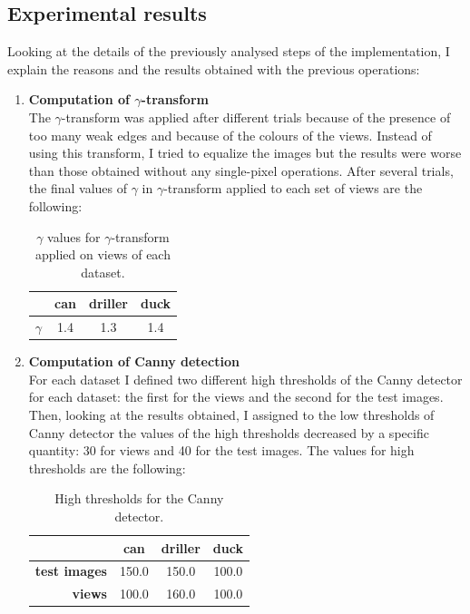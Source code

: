 \documentclass{article}
\begin{document}
\subsection{Experimental results}\label{exp}
Looking at the details of the previously analysed steps of the implementation, I explain the reasons and the results obtained with the previous operations:
\begin{enumerate}
\item{\textbf{Computation of $\gamma$-transform}\\
The $\gamma$-transform was applied after different trials because of the presence of too many weak edges and because of the colours of the views. Instead of using this transform, I tried to equalize the images but the results were worse than those obtained without any single-pixel operations. After several trials, the final values of $\gamma$ in $\gamma$-transform applied to each set of views are the following:
\begin{table}[H]
\footnotesize\centering
\begin{tabular}{rccc}
\cline{2-4}
& \textbf{can} & \textbf{driller} & \textbf{duck}\\
\hline
{$\mathtt{\gamma}$} & {1.4} & {1.3} & {1.4}\\
\hline
\end{tabular}
\caption{$\gamma$ values for $\gamma$-transform applied on views of each dataset.}
\end{table}
}
\item{\textbf{Computation of Canny detection}\\
For each dataset I defined two different high thresholds of the Canny detector for each dataset: the first for the views and the second for the test images. Then, looking at the results obtained, I assigned to the low thresholds of Canny detector the values of the high thresholds decreased by a specific quantity: 30 for views and 40 for the test images. The values for high thresholds are the following:
\begin{table}[H]
\footnotesize\centering
\begin{tabular}{rccc}
\cline{2-4}
& \textbf{can} & \textbf{driller} & \textbf{duck}\\
\hline
\textbf{test images} & {150.0} & {150.0} & {100.0}\\
\hline
\textbf{views} & {100.0} & {160.0} & {100.0}\\
\hline
\end{tabular}
\caption{High thresholds for the Canny detector.}
\end{table}
}
\end{enumerate}
\end{document}
